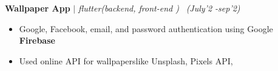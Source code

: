 \documentclass{article}
\newcommand{\xfilll}[2][1ex]{
\dimen0=#2\advance\dimen0 by #1
\leaders\hrule height \dimen0 depth -#1\hfill}
\begin{document}
\begin{itemize}[label=\textcolor{myblue}{\textbullet},itemsep = -1.15 mm, leftmargin=6mm]

\end{itemize}
\vspace{-5pt}
\textbf{Wallpaper App} $\vert$ \textit{flutter(backend, front-end )}  \hfill{\ \textit{(July’2 -sep'2)}}\\
\begin{itemize}[label=\textcolor{myblue}{\textbullet},itemsep =  -0.5 mm, leftmargin=6mm]
\vspace{-15.5pt}
\item Google, Facebook, email, and password authentication using Google \textbf{Firebase}
\item  Used online API  for wallpaperslike  Unsplash, Pixels  API,  

\end{itemize}



\vspace{-10pt}
\end{document}

